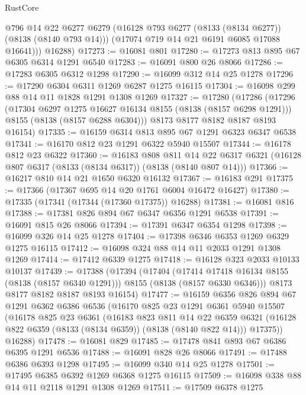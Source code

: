 \begin{lexlean}{RustCore}
\begin{coremodule}
          @796
          @14
          @22
          @6277
          @6279
          (@16128 @793 @6277 (@8133 (@8134 @6277)) (@8138 (@8140 @793 @14)))
          (@17074 @719 @14 @21 @6191 @6085 @17088 @16641)))
      @16288)
@17273 := @16081 @801
@17280 := @17273 @813 @895 @67 @6305 @6314 @1291 @6540
@17283 := @16091 @800 @26 @8066
@17286 := @17283 @6305 @6312 @1298
@17290 := @16099 @312 @14 @25 @1278
@17296 := @17290 @6304 @6311 @1269 @6287 @1275 @16115
@17304 := @16098 @299 @88 @14 @11 @1828 @1291 @1308 @1269
@17327 := @17280
    (@17286
      (@17296
        (@17304 @6297 @1275 @16627 @16134 @8155 (@8138 (@8157 @6298 @1291)))
        @8155
        (@8138 (@8157 @6288 @6304)))
      @8173
      @8177
      @8182
      @8187
      @8193
      @16154)
@17335 := @16159 @6314 @813 @895 @67 @1291 @6323 @6347 @6538
@17341 := @16170 @812 @23 @1291 @6322 @5940 @15507
@17344 := @16178 @812 @23 @6322
@17360 := @16183
    @808
    @811
    @14
    @22
    @6317
    @6321
    (@16128 @807 @6317 (@8133 (@8134 @6317)) (@8138 (@8140 @807 @14)))
@17366 := @16217 @810 @14 @21 @1650 @6320 @16132
@17367 := @16183 @291
@17375 := @17366 (@17367 @695 @14 @20 @1761 @6004 @16472 @16427)
@17380 := @17335 (@17341 (@17344 (@17360 @17375)) @16288)
@17381 := @16081 @816
@17388 := @17381 @826 @894 @67 @6347 @6356 @1291 @6538
@17391 := @16091 @815 @26 @8066
@17394 := @17391 @6347 @6354 @1298
@17398 := @16099 @326 @14 @25 @1278
@17404 := @17398 @6346 @6353 @1269 @6329 @1275 @16115
@17412 := @16098 @324 @88 @14 @11 @2033 @1291 @1308 @1269
@17414 := @17412 @6339 @1275
@17418 := @16128 @323 @2033 @10133 @10137
@17439 := @17388
    (@17394
      (@17404
        (@17414 @17418 @16134 @8155 (@8138 (@8157 @6340 @1291)))
        @8155
        (@8138 (@8157 @6330 @6346)))
      @8173
      @8177
      @8182
      @8187
      @8193
      @16154)
@17477 := @16159
    @6356
    @826
    @894
    @67
    @1291
    @6362
    @6386
    @6536
    (@16170
      @825
      @23
      @1291
      @6361
      @5940
      @15507
      (@16178
        @825
        @23
        @6361
        (@16183
          @823
          @811
          @14
          @22
          @6359
          @6321
          (@16128 @822 @6359 (@8133 (@8134 @6359)) (@8138 (@8140 @822 @14)))
          @17375))
      @16288)
@17478 := @16081 @829
@17485 := @17478 @841 @893 @67 @6386 @6395 @1291 @6536
@17488 := @16091 @828 @26 @8066
@17491 := @17488 @6386 @6393 @1298
@17495 := @16099 @340 @14 @25 @1278
@17501 := @17495 @6385 @6392 @1269 @6368 @1275 @16115
@17509 := @16098 @338 @88 @14 @11 @2118 @1291 @1308 @1269
@17511 := @17509 @6378 @1275

\end{coremodule}
\end{lexlean}
